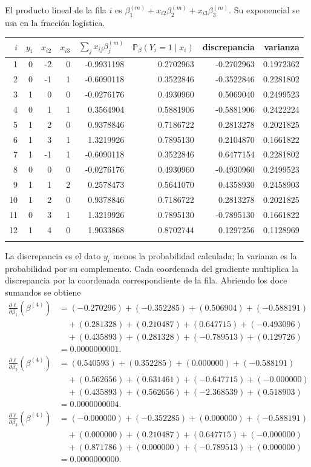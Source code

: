 \documentclass[11pt,a4paper]{article}
\newcommand{\Prob}{\mathbb P}
\begin{document}
El producto lineal de la fila \(i\) es
\(\beta_1^{(m)}+x_{i2}\beta_2^{(m)}+x_{i3}\beta_3^{(m)}\).
Su exponencial se usa en la fracción logística.
\begin{center}\scriptsize
\begin{tabular}{rrrrrrrr}\toprule
\(i\)&\(y_i\)&\(x_{i2}\)&\(x_{i3}\)&\(\sum_jx_{ij}\beta_j^{(m)}\)&\(\Prob_\beta(Y_i=1\mid x_i)\)&discrepancia&varianza\\\midrule
1&0&-2&0&-0.9931198&0.2702963&-0.2702963&0.1972362\\
2&0&-1&1&-0.6090118&0.3522846&-0.3522846&0.2281802\\
3&1&0&0&-0.0276176&0.4930960&0.5069040&0.2499523\\
4&0&1&1&0.3564904&0.5881906&-0.5881906&0.2422224\\
5&1&2&0&0.9378846&0.7186722&0.2813278&0.2021825\\
6&1&3&1&1.3219926&0.7895130&0.2104870&0.1661822\\
7&1&-1&1&-0.6090118&0.3522846&0.6477154&0.2281802\\
8&0&0&0&-0.0276176&0.4930960&-0.4930960&0.2499523\\
9&1&1&2&0.2578473&0.5641070&0.4358930&0.2458903\\
10&1&2&0&0.9378846&0.7186722&0.2813278&0.2021825\\
11&0&3&1&1.3219926&0.7895130&-0.7895130&0.1661822\\
12&1&4&0&1.9033868&0.8702744&0.1297256&0.1128969\\
\\\bottomrule\end{tabular}\end{center}
La discrepancia es el dato \(y_i\) menos la probabilidad
calculada; la varianza es la probabilidad por su complemento.
Cada coordenada del gradiente multiplica la discrepancia por
la coordenada correspondiente de la fila. Abriendo los doce
sumandos se obtiene
\[
\begin{aligned}
\frac{\partial\ell}{\partial\beta_1}(\beta^{(4)})&=(-0.270296)+(-0.352285)+(0.506904)+(-0.588191)\\&\quad+(0.281328)+(0.210487)+(0.647715)+(-0.493096)\\&\quad+(0.435893)+(0.281328)+(-0.789513)+(0.129726)\\&=0.0000000001.\end{aligned}
\]
\[
\begin{aligned}
\frac{\partial\ell}{\partial\beta_2}(\beta^{(4)})&=(0.540593)+(0.352285)+(0.000000)+(-0.588191)\\&\quad+(0.562656)+(0.631461)+(-0.647715)+(-0.000000)\\&\quad+(0.435893)+(0.562656)+(-2.368539)+(0.518903)\\&=0.0000000004.\end{aligned}
\]
\[
\begin{aligned}
\frac{\partial\ell}{\partial\beta_3}(\beta^{(4)})&=(-0.000000)+(-0.352285)+(0.000000)+(-0.588191)\\&\quad+(0.000000)+(0.210487)+(0.647715)+(-0.000000)\\&\quad+(0.871786)+(0.000000)+(-0.789513)+(0.000000)\\&=0.0000000000.\end{aligned}
\]
\end{document}
